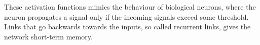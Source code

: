 \newline
{}
\newline
{}
\newline
These activation functions mimics the behaviour of biological neurons, where the neuron propagates
a signal only if the incoming signals exceed some threshold.
Links that go backwards towards the inputs, so called recurrent links, gives the network short-term memory.

